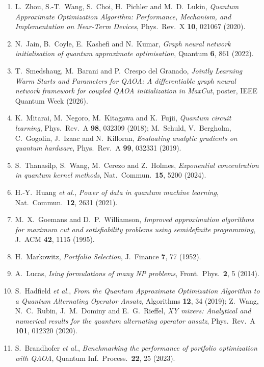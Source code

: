 \documentclass[12pt,a4paper]{article}
\begin{document}
\begin{enumerate}
    \item L.~Zhou, S.-T.~Wang, S.~Choi, H.~Pichler and M.~D.~Lukin, \textit{Quantum Approximate Optimization Algorithm: Performance, Mechanism, and Implementation on Near-Term Devices}, Phys.\ Rev.\ X \textbf{10}, 021067 (2020).
    \item N.~Jain, B.~Coyle, E.~Kashefi and N.~Kumar, \textit{Graph neural network initialisation of quantum approximate optimisation}, Quantum \textbf{6}, 861 (2022).
    \item T.~Smedshaug, M.~Barani and P.~Crespo del Granado, \textit{Jointly Learning Warm Starts and Parameters for QAOA: A differentiable graph neural network framework for coupled QAOA initialization in MaxCut}, poster, IEEE Quantum Week (2026).
    \item K.~Mitarai, M.~Negoro, M.~Kitagawa and K.~Fujii, \textit{Quantum circuit learning}, Phys.\ Rev.\ A \textbf{98}, 032309 (2018); M.~Schuld, V.~Bergholm, C.~Gogolin, J.~Izaac and N.~Killoran, \textit{Evaluating analytic gradients on quantum hardware}, Phys.\ Rev.\ A \textbf{99}, 032331 (2019).
    \item S.~Thanasilp, S.~Wang, M.~Cerezo and Z.~Holmes, \textit{Exponential concentration in quantum kernel methods}, Nat.\ Commun.\ \textbf{15}, 5200 (2024).
    \item H.-Y.~Huang \textit{et al.}, \textit{Power of data in quantum machine learning}, Nat.\ Commun.\ \textbf{12}, 2631 (2021).
    \item M.~X.~Goemans and D.~P.~Williamson, \textit{Improved approximation algorithms for maximum cut and satisfiability problems using semidefinite programming}, J.\ ACM \textbf{42}, 1115 (1995).
    \item H.~Markowitz, \textit{Portfolio Selection}, J.\ Finance \textbf{7}, 77 (1952).
    \item A.~Lucas, \textit{Ising formulations of many NP problems}, Front.\ Phys.\ \textbf{2}, 5 (2014).
    \item S.~Hadfield \textit{et al.}, \textit{From the Quantum Approximate Optimization Algorithm to a Quantum Alternating Operator Ansatz}, Algorithms \textbf{12}, 34 (2019); Z.~Wang, N.~C.~Rubin, J.~M.~Dominy and E.~G.~Rieffel, \textit{XY mixers: Analytical and numerical results for the quantum alternating operator ansatz}, Phys.\ Rev.\ A \textbf{101}, 012320 (2020).
    \item S.~Brandhofer \textit{et al.}, \textit{Benchmarking the performance of portfolio optimization with QAOA}, Quantum Inf.\ Process.\ \textbf{22}, 25 (2023).

\end{enumerate}
\end{document}
